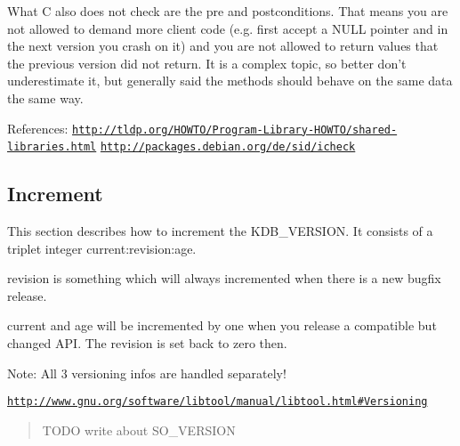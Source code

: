 What C also does not check are the pre and postconditions. That means you are not allowed to demand more client code (e.\+g. first accept a N\+U\+L\+L pointer and in the next version you crash on it) and you are not allowed to return values that the previous version did not return. It is a complex topic, so better don't underestimate it, but generally said the methods should behave on the same data the same way.

References\+: \href{http://tldp.org/HOWTO/Program-Library-HOWTO/shared-libraries.html}{\tt http\+://tldp.\+org/\+H\+O\+W\+T\+O/\+Program-\/\+Library-\/\+H\+O\+W\+T\+O/shared-\/libraries.\+html} \href{http://packages.debian.org/de/sid/icheck}{\tt http\+://packages.\+debian.\+org/de/sid/icheck}

\subsection*{Increment}

This section describes how to increment the {\ttfamily K\+D\+B\+\_\+\+V\+E\+R\+S\+I\+O\+N}. It consists of a triplet integer {\ttfamily current\+:revision\+:age}.

{\ttfamily revision} is something which will always incremented when there is a new bugfix release.

{\ttfamily current} and {\ttfamily age} will be incremented by one when you release a compatible but changed A\+P\+I. The revision is set back to zero then.

Note\+: All 3 versioning infos are handled separately!

\href{http://www.gnu.org/software/libtool/manual/libtool.html#Versioning}{\tt http\+://www.\+gnu.\+org/software/libtool/manual/libtool.\+html\#\+Versioning}

\begin{quote}
T\+O\+D\+O write about S\+O\+\_\+\+V\+E\+R\+S\+I\+O\+N\end{quote}
